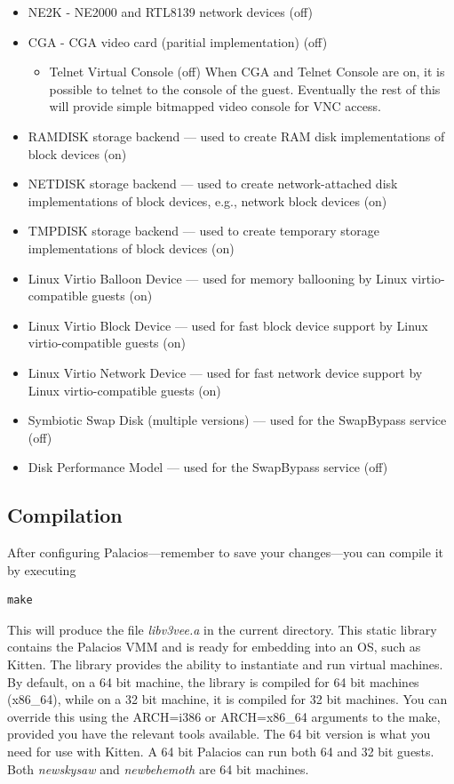 \documentclass[11pt]{article}
\begin{document}
\begin{itemize}
\begin{itemize}
\item NE2K - NE2000 and RTL8139 network devices (off)
\item CGA - CGA video card (paritial implementation) (off)
\begin{itemize}
\item Telnet Virtual Console (off)   When CGA and Telnet Console are
on, it is possible to telnet to the console of the guest.   Eventually
the rest of this will provide simple bitmapped video console for VNC
access.
\end{itemize}
\item RAMDISK storage backend --- used to create RAM disk
implementations of block devices (on)
\item NETDISK storage backend --- used to create network-attached disk
implementations of block devices, e.g., network block devices (on)
\item TMPDISK storage backend --- used to create temporary storage
implementations of block devices (on)
\item Linux Virtio Balloon Device --- used for memory ballooning by
Linux virtio-compatible guests (on)
\item Linux Virtio Block Device --- used for fast block device support
by Linux virtio-compatible guests (on)
\item Linux Virtio Network Device --- used for fast network device support
by Linux virtio-compatible guests (on) 
\item Symbiotic Swap Disk (multiple versions) --- used for the
SwapBypass service (off)
\item Disk Performance Model --- used for the
SwapBypass service (off)
\end{itemize}
\end{itemize}

\subsection{Compilation}

After configuring Palacios---remember to save your changes---you can
compile it by executing
\begin{verbatim}
make 
\end{verbatim}
This will produce the file {\em libv3vee.a} in the current directory.
This static library contains the Palacios VMM and is ready for
embedding into an OS, such as Kitten.  The library provides the
ability to instantiate and run virtual machines.  By default, on a 64
bit machine, the library is compiled for 64 bit machines (x86\_64),
while on a 32 bit machine, it is compiled for 32 bit machines.  You
can override this using the ARCH=i386 or ARCH=x86\_64 arguments to the
make, provided you have the relevant tools available.  The 64 bit
version is what you need for use with Kitten.  A 64 bit Palacios can
run both 64 and 32 bit guests.  Both {\em newskysaw} and {\em
newbehemoth} are 64 bit machines. 
\end{document}
